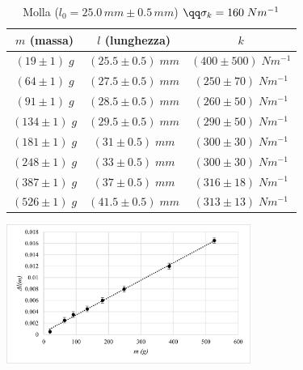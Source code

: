 \begin{table}[h]
    \begin{subtable}[h]{0.45\textwidth}
    \begin{tabular}{|c|c|c|}
        \hline
        $m$ (massa) & $l$ (lunghezza) & $k$\\
        \hline

        $(19 \pm 1)\; g$  & $(25.5 \pm 0.5) \;mm$ & $(400 \pm 500)\; Nm^{-1}$\\ 
        $(64 \pm 1)\; g$  & $(27.5 \pm 0.5) \;mm$ & $(250 \pm 70)\; Nm^{-1}$\\ 
        $(91 \pm 1)\; g$  & $(28.5 \pm 0.5) \;mm$ & $(260 \pm 50)\; Nm^{-1}$\\ 
        $(134 \pm 1)\; g$  & $(29.5 \pm 0.5) \;mm$ & $(290 \pm 50)\; Nm^{-1}$\\ 
        $(181 \pm 1)\; g$  & $(31 \pm 0.5) \;mm$ & $(300 \pm 30)\; Nm^{-1}$\\ 
        $(248 \pm 1)\; g$  & $(33 \pm 0.5) \;mm$ & $(300 \pm 30)\; Nm^{-1}$\\ 
        $(387 \pm 1)\; g$  & $(37 \pm 0.5) \;mm$ & $(316 \pm 18)\; Nm^{-1}$\\ 
        $(526 \pm 1)\; g$  & $(41.5 \pm 0.5) \;mm$ & $(313 \pm 13)\; Nm^{-1}$\\ 


        \hline
        
    \end{tabular}
    \end{subtable}
    \hfill
    \begin{subtable}[h]{0.45\textwidth}
        \includegraphics[width = 8cm]{plots/pltMolla.png}
    \end{subtable}
    \caption{Molla ($l_0 = 25.0\, mm \pm 0.5\,mm$) $\qq \sigma_k = 160\; Nm^{-1}$}
    \label{tabellaMolla}
\end{table}
